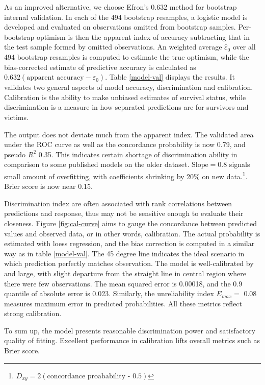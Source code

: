 \documentclass[]{interact}
\theoremstyle{plain}%
\theoremstyle{definition}
\theoremstyle{remark}
\begin{document}
As an improved alternative, we choose Efron's 0.632 method for bootstrap internal validation. In each of the 494 bootstrap resamples, a logistic model is developed and evaluated on observations omitted from bootstrap samples. Per-bootstrap optimism is then the apparent index of accuracy subtracting that in the test sample formed by omitted observations. An weighted average \(\hat{\varepsilon}_0\) over all 494 bootstrap resamples is computed to estimate the true optimism, while the bias-corrected
estimate of predictive accuracy is calculated as \(0.632(\text{apparent accuracy} - \hat{\varepsilon}_0)\). Table \ref{model-val} displays the results. It validates two general aspects of model accuracy, discrimination and calibration. Calibration is the ability to make unbiased estimates of survival status, while discrimination is a measure in how separated predictions are for survivors and victims.



The output does not deviate much from the apparent index. The validated area under the ROC curve as well as the concordance probability is now 0.79, and pseudo \(R^2\) 0.35. This indicates certain shortage of discrimination ability in comparison to some published models on the older dataset. \(\text{Slope} = 0.8\) signals small amount of overfitting, with coefficients shrinking by 20\% on new data.\footnote{\(D_{xy} = 2(\text{concordance proabability - 0.5})\)}. Brier score is now near 0.15.

Discrimination index are often associated with rank correlations between predictions and response, thus may not be sensitive enough to evaluate their closeness. Figure \ref{fig:cal-curve} aims to gauge the concordance between predicted values and observed data, or in other words, calibration. The actual probability is estimated with loess regression, and the bias correction is computed in a similar way as in table \ref{model-val}. The 45 degree line indicates the ideal scenario in which prediction perfectly matches observation. The model is well-calibrated by and large, with slight departure from the straight line in central region where there were few observations. The mean squared error is 0.00018, and the 0.9 quantile of absolute error
is 0.023. Similarly, the unreliability index \(E_{max} =\) 0.08 measures maximum error in predicted probabilities. All these metrics reflect strong calibration.

To sum up, the model presents reasonable discrimination power and satisfactory quality of fitting. Excellent performance in calibration lifts overall metrics such as Brier score.
\end{document}
